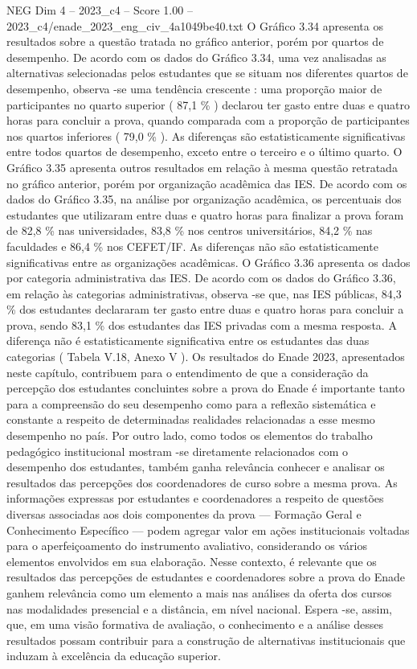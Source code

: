 \begin{textsample}{NEG Dim 4 – 2023\_c4 – Score 1.00 – 2023\_c4/enade\_2023\_eng\_civ\_4a1049be40.txt}
O Gráfico 3.34 apresenta os resultados sobre a questão tratada no gráfico anterior, porém por quartos de desempenho.
De acordo com os dados do Gráfico 3.34, uma vez analisadas as alternativas selecionadas pelos estudantes que se situam nos diferentes quartos de desempenho, observa -se uma tendência crescente : uma proporção maior de participantes no quarto superior ( 87,1 \% ) declarou ter gasto entre duas e quatro horas para concluir a prova, quando comparada com a proporção de participantes nos quartos inferiores ( 79,0 \% ).
As diferenças são estatisticamente significativas entre todos quartos de desempenho, exceto entre o terceiro e o último quarto.
O Gráfico 3.35 apresenta outros resultados em relação à mesma questão retratada no gráfico anterior, porém por organização acadêmica das IES.
De acordo com os dados do Gráfico 3.35, na análise por organização acadêmica, os percentuais dos estudantes que utilizaram entre duas e quatro horas para finalizar a prova foram de 82,8 \% nas universidades, 83,8 \% nos centros universitários, 84,2 \% nas faculdades e 86,4 \% nos CEFET/IF.
As diferenças não são estatisticamente significativas entre as organizações acadêmicas.
O Gráfico 3.36 apresenta os dados por categoria administrativa das IES.
De acordo com os dados do Gráfico 3.36, em relação às categorias administrativas, observa -se que, nas IES públicas, 84,3 \% dos estudantes declararam ter gasto entre duas e quatro horas para concluir a prova, sendo 83,1 \% dos estudantes das IES privadas com a mesma resposta.
A diferença não é estatisticamente significativa entre os estudantes das duas categorias ( Tabela V.18, Anexo V ).
Os resultados do Enade 2023, apresentados neste capítulo, contribuem para o entendimento de que a consideração da percepção dos estudantes concluintes sobre a prova do Enade é importante tanto para a compreensão do seu desempenho como para a reflexão sistemática e constante a respeito de determinadas realidades relacionadas a esse mesmo desempenho no país.
Por outro lado, como todos os elementos do trabalho pedagógico institucional mostram -se diretamente relacionados com o desempenho dos estudantes, também ganha relevância conhecer e analisar os resultados das percepções dos coordenadores de curso sobre a mesma prova.
As informações expressas por estudantes e coordenadores a respeito de questões diversas associadas aos dois componentes da prova — Formação Geral e Conhecimento Específico — podem agregar valor em ações institucionais voltadas para o aperfeiçoamento do instrumento avaliativo, considerando os vários elementos envolvidos em sua elaboração.
Nesse contexto, é relevante que os resultados das percepções de estudantes e coordenadores sobre a prova do Enade ganhem relevância como um elemento a mais nas análises da oferta dos cursos nas modalidades presencial e a distância, em nível nacional.
Espera -se, assim, que, em uma visão formativa de avaliação, o conhecimento e a análise desses resultados possam contribuir para a construção de alternativas institucionais que induzam à excelência da educação superior.

\end{textsample}
